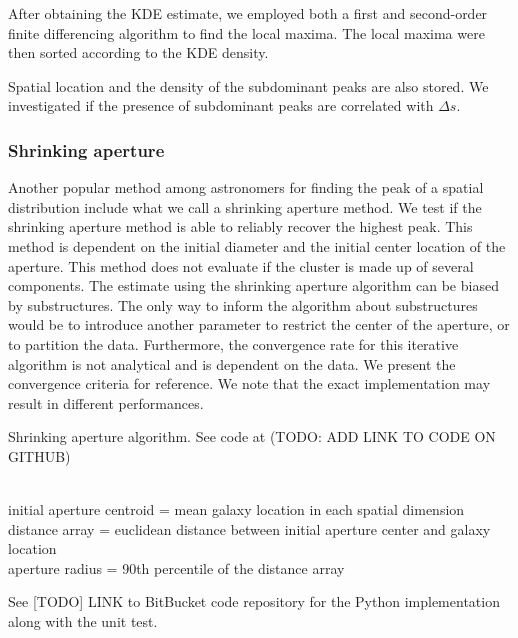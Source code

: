 After obtaining the KDE estimate, we employed both a first and second-order  
finite differencing algorithm to find the local maxima.  
The local maxima were then sorted according to the KDE density.  



Spatial location and the density of the subdominant peaks are also stored.
We investigated if the presence of subdominant peaks are correlated with
$\Delta s$. 

\subsubsection{Shrinking aperture}
Another popular method among astronomers for finding the peak of a spatial
distribution include what we call a shrinking aperture method.
We test if the shrinking aperture method is able to reliably recover the highest 
peak.
This method is dependent on the initial diameter and the initial center 
location of the aperture.
This method does not evaluate if the cluster is made up of
several components.
The estimate using the shrinking aperture algorithm can be biased by
substructures. The only way to inform the algorithm about substructures would
be to introduce another parameter to restrict the center of the aperture, or to
partition the data.
Furthermore, the convergence rate for this iterative algorithm is not
analytical and is dependent on the data. We present the
convergence criteria for reference. 
We note that the exact implementation may result in different performances.
\begin{algorithm}
	\caption{Shrinking aperture algorithm. See code at (TODO: ADD LINK TO CODE ON
	GITHUB)}
	 \hrulefill \\

	 initial aperture centroid = mean galaxy location in each spatial dimension\\
 	distance array = euclidean distance between initial aperture center and galaxy
	location \\
 	aperture radius = 90th percentile of the distance array\\ 
	   \hrulefill
 \end{algorithm}
 See [TODO] LINK to BitBucket code repository for the Python implementation
 along with the unit test.


